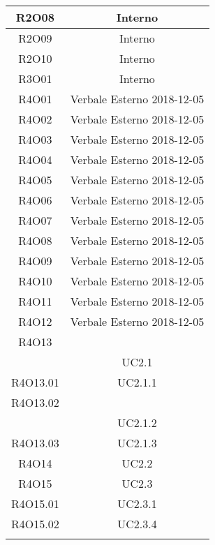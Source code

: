 \begin{tabularx}{\textwidth}{|C|C|}
	\hline
	R2O08&Interno\\
	\hline
	R2O09&Interno\\
	\hline
	R2O10&Interno\\
	\hline
	R3O01&Interno\\
	\hline
	R4O01&Verbale Esterno 2018-12-05\\
	\hline
	R4O02&Verbale Esterno 2018-12-05\\
	\hline
	R4O03&Verbale Esterno 2018-12-05\\
	\hline
	R4O04&Verbale Esterno 2018-12-05\\
	\hline
	R4O05&Verbale Esterno 2018-12-05\\
	\hline
	R4O06&Verbale Esterno 2018-12-05\\
	\hline
	R4O07&Verbale Esterno 2018-12-05\\
	\hline
	R4O08&Verbale Esterno 2018-12-05\\
	\hline
	R4O09&Verbale Esterno 2018-12-05\\
	\hline
	R4O10&Verbale Esterno 2018-12-05\\
	\hline
	R4O11&Verbale Esterno 2018-12-05\\
	\hline
	R4O12&Verbale Esterno 2018-12-05\\
	\hline
	R4O13&\\& UC2.1\\
	\hline
	R4O13.01& UC2.1.1\\
	\hline
	R4O13.02&\\& UC2.1.2\\
	\hline
	R4O13.03&UC2.1.3\\
	\hline
	R4O14&UC2.2\\
	\hline
	R4O15&UC2.3\\
	\hline
	R4O15.01&UC2.3.1\\
	\hline
	R4O15.02&UC2.3.4\\
	\hline
	\caption{Tabella requisiti-fonti}
\end{tabularx}